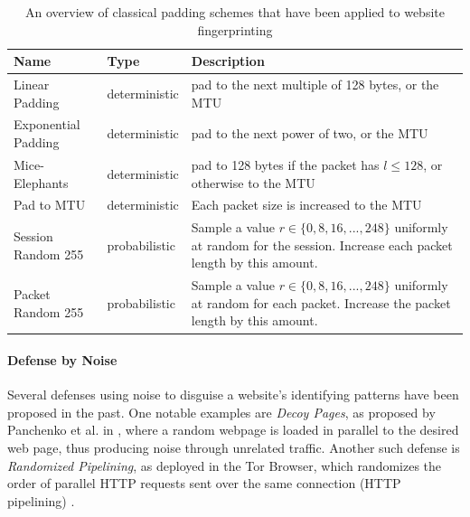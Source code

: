 \documentclass[
	ruledheaders=chapter,
	class=report,
	thesis={type=master, department=inf},
	accentcolor=1c,
	custommargins=true,
	marginpar=false,
	parskip=half-,
	fontsize=11pt,
]{tudapub}
\begin{document}
	\begin{table}
		\centering
		\small
		\begin{tabularx}{\textwidth}{llX}
			\toprule \textbf{Name} & \textbf{Type} & \textbf{Description} \\
			\midrule Linear Padding & deterministic & pad to the next multiple of 128 bytes, or the MTU \\
			Exponential Padding & deterministic & pad to the next power of two, or the MTU \\
			Mice-Elephants & deterministic & pad to 128 bytes if the packet has $l \leq 128$, or otherwise to the MTU \\
			Pad to MTU & deterministic & Each packet size is increased to the MTU \\ \addlinespace 
			Session Random 255 & probabilistic & Sample a value $r \in \{0, 8, 16, ..., 248\}$ uniformly at random for the session. Increase each packet length by this amount. \\
			Packet Random 255 & probabilistic & Sample a value $r \in \{0, 8, 16, ..., 248\}$ uniformly at random for each packet. Increase the packet length by this amount. \\
			\bottomrule
		\end{tabularx}
		\caption{An overview of classical padding schemes that have been applied to website fingerprinting \cite{Dyer2012}}
		\label{tbl:padding}
	\end{table}

	\paragraph{Defense by Noise} Several defenses using noise to disguise a website's identifying patterns have been proposed in the past. One notable examples are \textit{Decoy Pages}, as proposed by Panchenko et al. in \cite{Panchenko2011}, where a random webpage is loaded in parallel to the desired web page, thus producing noise through unrelated traffic. Another such defense is \textit{Randomized Pipelining}, as deployed in the Tor Browser, which randomizes the order of parallel HTTP requests sent over the same connection (HTTP pipelining) \cite{Perry2011,Cherubin2017}.
	
\end{document}
